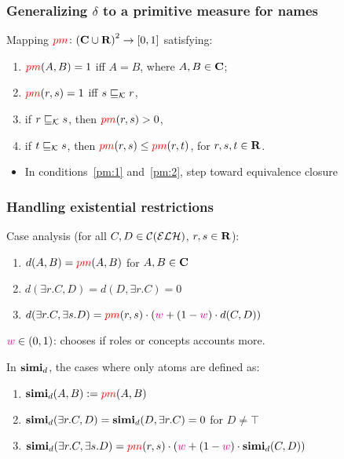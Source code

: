 \documentclass[smaller, dvipsnames]{beamer}
\begin{document}
\begin{frame}
  \frametitle{Generalizing \(\delta\) to a primitive measure for names}
  \begin{definition}
    Mapping \(\textcolor{red}{pm} \colon {(\mathbf{C}\cup \mathbf{R})}^2 \to [0,1]\)
    satisfying:
    \begin{enumerate}
      \item\label{pm:1} \(\textcolor{red}{pm}(A,B) = 1\) iff \(A = B\), where \(A,B \in \mathbf{C}\);
      \item\label{pm:2} \(\textcolor{red}{pm}(r,s) = 1\) iff \(s \sqsubseteq_{\mathcal{K}} r\),
      \item\label{pm:3} if \(r \sqsubseteq_{\mathcal{K}} s\), then \(\textcolor{red}{pm}(r,s) > 0\),
      \item\label{pm:4} if \(t \sqsubseteq_{\mathcal{K}} s\), then \(\textcolor{red}{pm}(r,s) \le \textcolor{red}{pm}(r,t)\), for \(r,s,t \in \mathbf{R}\).
    \end{enumerate}
  \end{definition}
  \onslide<+->
  \begin{itemize}%
    \item In conditions~\ref{pm:1} and~\ref{pm:2}, step toward \alert{equivalence closure}
  \end{itemize}
\end{frame}

\begin{frame}
  \frametitle{Handling existential restrictions}
  Case analysis (for all \(C,D \in \mathcal{C}(\mathcal{ELH})\), \(r,s \in \mathbf{R}\)):
  \begin{enumerate}
    \item \(d(A,B) = \textcolor{red}{pm}(A,B)\) for \(A,B \in \mathbf{C}\)
    \item \(d(\exists{}r.C,D) = d(D,\exists{}r.C) = 0\)
    \item \(d(\exists{}r.C,\exists{}s.D) =
    \textcolor{red}{pm}(r,s) \cdot \left(\textcolor{magenta}{w} + (1-\textcolor{magenta}{w}) \cdot d(C,D)\right)\)
  \end{enumerate}
  \(\textcolor{magenta}{w} \in (0,1)\): chooses if roles or concepts accounts more.

  \pause
  In \(\operatorname{\mathbf{simi}}_d\), the cases where only \alert{atoms} are defined as:
  \begin{tcolorbox}
    \begin{enumerate}
      \item \(\operatorname{\mathbf{simi}}_d(A,B) := \textcolor{red}{pm}(A,B)\)
      \item \(\operatorname{\mathbf{simi}}_d(\exists{}r.C,D) = \operatorname{\mathbf{simi}}_d(D,\exists{}r.C) = 0\) for \(D \ne \top\)
      \item \(\operatorname{\mathbf{simi}}_d(\exists{}r.C,\exists{}s.D) =
      \textcolor{red}{pm}(r,s) \cdot \left(\textcolor{magenta}{w} + (1-\textcolor{magenta}{w}) \cdot \operatorname{\mathbf{simi}}_d(C,D)\right)\)
    \end{enumerate}
  \end{tcolorbox}
\end{frame}
\end{document}
